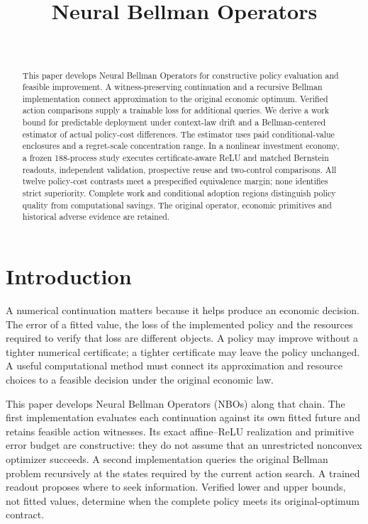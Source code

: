 \documentclass[ecta,nameyear,draft]{econsocart}
\begin{document}
\begin{frontmatter}
\title{Neural Bellman Operators}
\begin{aug}
\author[id=au1,addressref={add1}]{~}
\address[id=add1]{Peking University}
\end{aug}
\begin{abstract}
This paper develops Neural Bellman Operators for constructive policy evaluation and feasible improvement. A witness-preserving continuation and a recursive Bellman implementation connect approximation to the original economic optimum. Verified action comparisons supply a trainable loss for additional queries. We derive a work bound for predictable deployment under context-law drift and a Bellman-centered estimator of actual policy-cost differences. The estimator uses paid conditional-value enclosures and a regret-scale concentration range. In a nonlinear investment economy, a frozen 188-process study executes certificate-aware ReLU and matched Bernstein readouts, independent validation, prospective reuse and two-control comparisons. All twelve policy-cost contrasts meet a prespecified equivalence margin; none identifies strict superiority. Complete work and conditional adoption regions distinguish policy quality from computational savings. The original operator, economic primitives and historical adverse evidence are retained.
\end{abstract}
\begin{keyword}
\end{keyword}
\end{frontmatter}
\section{Introduction}\label{sec:introduction65}
A numerical continuation matters because it helps produce an economic decision. The error of a fitted value, the loss of the implemented policy and the resources required to verify that loss are different objects. A policy may improve without a tighter numerical certificate; a tighter certificate may leave the policy unchanged. A useful computational method must connect its approximation and resource choices to a feasible decision under the original economic law.

This paper develops Neural Bellman Operators (NBOs) along that chain. The first implementation evaluates each continuation against its own fitted future and retains feasible action witnesses. Its exact affine--ReLU realization and primitive error budget are constructive: they do not assume that an unrestricted nonconvex optimizer succeeds. A second implementation queries the original Bellman problem recursively at the states required by the current action search. A trained readout proposes where to seek information. Verified lower and upper bounds, not fitted values, determine when the complete policy meets its original-optimum contract.
\end{document}
